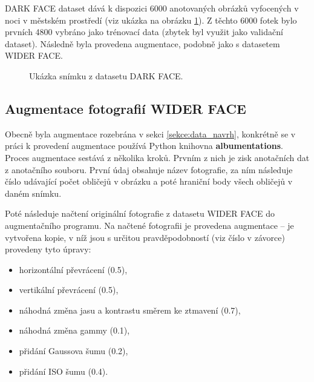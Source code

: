 DARK FACE dataset dává k dispozici 6000 anotovaných obrázků vyfocených v noci v městském prostředí (viz ukázka na obrázku \ref{obrazek:darkfaceexample}). Z těchto 6000 fotek bylo prvních 4800 vybráno jako trénovací data (zbytek byl využit jako validační dataset). Následně byla provedena augmentace, podobně jako s datasetem WIDER FACE.

\begin{figure}[H]
  \begin{center}
  \label{obrazek:darkfaceexample}
  \caption{Ukázka snímku z datasetu DARK FACE.}
  \end{center}
\end{figure}

\subsection*{Augmentace fotografií WIDER FACE}
Obecně byla augmentace rozebrána v sekci \ref{sekce:data_navrh}, konkrétně se v práci k provedení augmentace používá Python knihovna \textbf{albumentations}. Proces augmentace sestává z několika kroků. Prvním z nich
je zisk anotačních dat z anotačního souboru. První údaj obsahuje název fotografie, za ním následuje číslo udávající počet obličejů v obrázku a poté hraniční body všech obličejů v daném snímku.

Poté následuje načtení originální fotografie z datasetu WIDER FACE do augmentačního programu. Na načtené fotografii je provedena augmentace -- je vytvořena kopie, v níž jsou s určitou pravděpodobností (viz číslo v závorce) provedeny tyto úpravy:

\begin{itemize}
  \item horizontální převrácení (0.5),
  \item vertikální převrácení (0.5),
  \item náhodná změna jasu a kontrastu směrem ke ztmavení (0.7),
  \item náhodná změna gammy (0.1),
  \item přidání Gaussova šumu (0.2),
  \item přidání ISO šumu (0.4).
\end{itemize}

